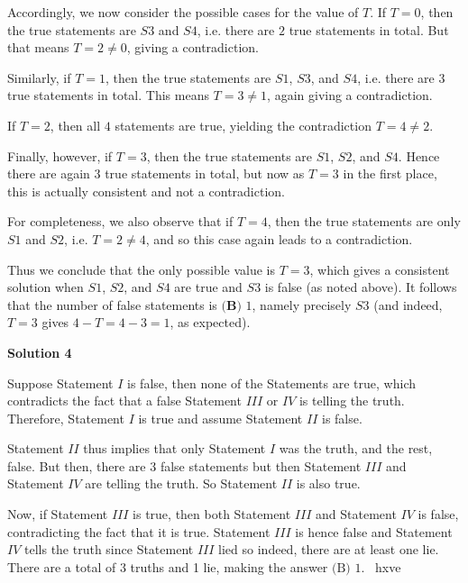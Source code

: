 \begin{enumerate}
 Accordingly, we now consider the possible cases for the value of $T$. If $T=0$, then the true statements are $S3$ and $S4$, i.e. there are $2$ true statements in total. But that means $T = 2 \neq 0$, giving a contradiction.

 Similarly, if $T=1$, then the true statements are $S1$, $S3$, and $S4$, i.e. there are $3$ true statements in total. This means $T = 3 \neq 1$, again giving a contradiction.

 If $T=2$, then all $4$ statements are true, yielding the contradiction $T = 4 \neq 2$.

 Finally, however, if $T=3$, then the true statements are $S1$, $S2$, and $S4$. Hence there are again $3$ true statements in total, but now as $T=3$ in the first place, this is actually consistent and not a contradiction.

 For completeness, we also observe that if $T=4$, then the true statements are only $S1$ and $S2$, i.e. $T = 2 \neq 4$, and so this case again leads to a contradiction.

 Thus we conclude that the only possible value is $T = 3$, which gives a consistent solution when $S1$, $S2$, and $S4$ are true and $S3$ is false (as noted above). It follows that the number of false statements is $\boxed{\textbf{(B) }1}$, namely precisely $S3$ (and indeed, $T = 3$ gives $4-T = 4-3 = 1$, as expected).

 



\textbf{Solution 4}

Suppose Statement $I$ is false, then none of the Statements are true, which contradicts the fact that a false Statement $III$ or $IV$ is telling the truth. Therefore, Statement $I$ is true and assume Statement $II$ is false. 

 Statement $II$ thus implies that only Statement $I$ was the truth, and the rest, false. But then, there are 3 false statements but then Statement $III$ and Statement $IV$ are telling the truth. So Statement $II$ is also true. 

 Now, if Statement $III$ is true, then both Statement $III$ and Statement $IV$ is false, contradicting the fact that it is true. Statement $III$ is hence false and Statement $IV$ tells the truth since Statement $III$ lied so indeed, there are at least one lie. There are a total of 3 truths and 1 lie, making the answer $\boxed{\text{(B) }1}$. ~hxve

 




\end{enumerate}
